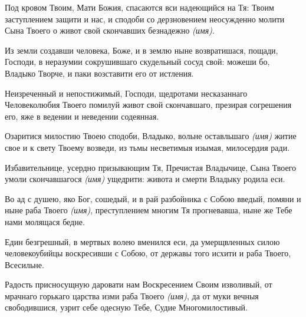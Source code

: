\begin{mymulticols}
\inyne


Под кровом Твоим, Мати Божия, спасаются вси надеющийся на Тя: Твоим заступлением защити и нас, и сподоби со дерзновением неосужденно молити Сына Твоего о живот свой скончавших безнадежно {\itshape (имя)}. 








Из земли создавши человека, Боже, и в землю ныне возвратишася, пощади, Господи, в неразумии сокрушившаго скудельный сосуд свой: можеши бо, Владыко Творче, и паки возставити его от истления.




Неизреченный и непостижимый, Господи, щедротами несказаннаго Человеколюбия Твоего помилуй живот свой скончавшаго, презирая согрешения его, яже в ведении и неведении содеянная.


\slava


Озаритися милостию Твоею сподоби, Владыко, вольне оставльшаго {\itshape (имя)} житие свое и к свету Твоему возведи, из тьмы несветимыя изымая, милосердия ради.


\inyne


Избавительнице, усердно призывающим Тя, Пречистая Владычице, Сына Твоего умоли скончавшагося {\itshape (имя)} ущедрити: живота и смерти Владыку родила еси. 







Во ад с душею, яко Бог, сошедый, и в рай разбойника с Собою введый, помяни и ныне раба Твоего {\itshape (имя)}, преступлением многим Тя прогневавша, ныне же Тебе нами молящася бедне.




Един безгрешный, в мертвых волею вменился еси, да умерщвленных силою человекоубийцы воскресивши с Собою, от державы того исхити и раба Твоего, Всесильне.


\slava


Радость присносущную даровати нам Воскресением Своим изволивый, от мрачнаго горькаго царства изми раба Твоего {\itshape (имя)}, да от муки вечныя свободившися, узрит себе одесную Тебе, Судие Многомилостивый.



\end{mymulticols}

